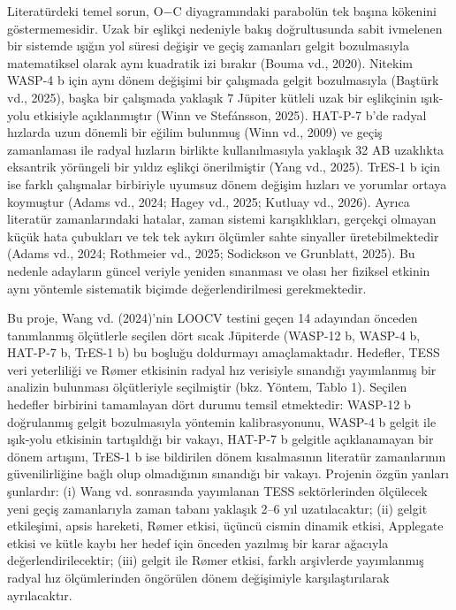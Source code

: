 Literatürdeki temel sorun, O−C diyagramındaki parabolün tek başına kökenini göstermemesidir. Uzak bir eşlikçi nedeniyle bakış doğrultusunda sabit ivmelenen bir sistemde ışığın yol süresi değişir ve geçiş zamanları gelgit bozulmasıyla matematiksel olarak aynı kuadratik izi bırakır (Bouma vd., 2020). Nitekim WASP-4 b için aynı dönem değişimi bir çalışmada gelgit bozulmasıyla (Baştürk vd., 2025), başka bir çalışmada yaklaşık 7 Jüpiter kütleli uzak bir eşlikçinin ışık-yolu etkisiyle açıklanmıştır (Winn ve Stefánsson, 2025). HAT-P-7 b'de radyal hızlarda uzun dönemli bir eğilim bulunmuş (Winn vd., 2009) ve geçiş zamanlaması ile radyal hızların birlikte kullanılmasıyla yaklaşık 32 AB uzaklıkta eksantrik yörüngeli bir yıldız eşlikçi önerilmiştir (Yang vd., 2025). TrES-1 b için ise farklı çalışmalar birbiriyle uyumsuz dönem değişim hızları ve yorumlar ortaya koymuştur (Adams vd., 2024; Hagey vd., 2025; Kutluay vd., 2026). Ayrıca literatür zamanlarındaki hatalar, zaman sistemi karışıklıkları, gerçekçi olmayan küçük hata çubukları ve tek tek aykırı ölçümler sahte sinyaller üretebilmektedir (Adams vd., 2024; Rothmeier vd., 2025; Sodickson ve Grunblatt, 2025). Bu nedenle adayların güncel veriyle yeniden sınanması ve olası her fiziksel etkinin aynı yöntemle sistematik biçimde değerlendirilmesi gerekmektedir.

Bu proje, Wang vd. (2024)'nin LOOCV testini geçen 14 adayından önceden tanımlanmış ölçütlerle seçilen dört sıcak Jüpiterde (WASP-12 b, WASP-4 b, HAT-P-7 b, TrES-1 b) bu boşluğu doldurmayı amaçlamaktadır. Hedefler, TESS veri yeterliliği ve Rømer etkisinin radyal hız verisiyle sınandığı yayımlanmış bir analizin bulunması ölçütleriyle seçilmiştir (bkz. Yöntem, Tablo 1). Seçilen hedefler birbirini tamamlayan dört durumu temsil etmektedir: WASP-12 b doğrulanmış gelgit bozulmasıyla yöntemin kalibrasyonunu, WASP-4 b gelgit ile ışık-yolu etkisinin tartışıldığı bir vakayı, HAT-P-7 b gelgitle açıklanamayan bir dönem artışını, TrES-1 b ise bildirilen dönem kısalmasının literatür zamanlarının güvenilirliğine bağlı olup olmadığının sınandığı bir vakayı. Projenin özgün yanları şunlardır: (i) Wang vd. sonrasında yayımlanan TESS sektörlerinden ölçülecek yeni geçiş zamanlarıyla zaman tabanı yaklaşık 2–6 yıl uzatılacaktır; (ii) gelgit etkileşimi, apsis hareketi, Rømer etkisi, üçüncü cismin dinamik etkisi, Applegate etkisi ve kütle kaybı her hedef için önceden yazılmış bir karar ağacıyla değerlendirilecektir; (iii) gelgit ile Rømer etkisi, farklı arşivlerde yayımlanmış radyal hız ölçümlerinden öngörülen dönem değişimiyle karşılaştırılarak ayrılacaktır.


